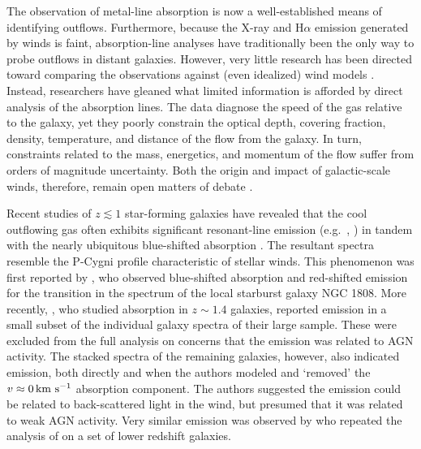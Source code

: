 \documentclass[12pt,preprint]{aastex}
\begin{document}
The observation of metal-line absorption is now a well-established
means of identifying outflows.  Furthermore, because the X-ray and
H$\alpha$ emission generated by winds is faint, absorption-line
analyses have traditionally been the only way to probe outflows in
distant galaxies. However, very little research
has been directed
toward comparing the observations against (even idealized) wind
models \citep[e.g.][]{fmm+09}.  
Instead, researchers have gleaned what limited information
is afforded by direct analysis of the absorption lines.  The data
diagnose the speed of the gas relative to the galaxy, 
yet they poorly constrain the
optical depth, covering fraction, density, temperature, and distance
of the flow from the galaxy.   In turn, constraints related to the
mass, energetics, and momentum of the flow suffer from
orders of magnitude uncertainty.  Both the origin and impact of
galactic-scale winds, therefore, remain open matters of debate
\citep{mqt05,sdr08,sh09,ssr02,od06,kkd+09}.

Recent studies of $z \lesssim 1$ star-forming galaxies have revealed that
the cool outflowing gas often exhibits significant resonant-line emission (e.g.\
, ) in
tandem with the nearly ubiquitous blue-shifted absorption
\citep{wcp+09,rwk+10,cth+10}.  The resultant spectra resemble the P-Cygni
profile characteristic of stellar winds.
This phenomenon was first reported by \citet{phillips93}, who observed 
blue-shifted absorption and red-shifted emission for the \ion{Na}{1}
transition in the spectrum of the local starburst galaxy NGC 1808.
More recently, \cite{wcp+09}, who
studied  absorption in $z \sim 1.4$ galaxies, reported
\ion{Mg}{2} emission in a small subset of the individual galaxy
spectra of their large sample.  These were excluded from the full
analysis on concerns that the emission was related to AGN activity.
The stacked spectra of the remaining galaxies, however, also indicated
\ion{Mg}{2} emission, both directly and when the authors modeled and
`removed' the $v \approx 0\, {\rm km~s^{-1}}$ absorption component.  The
authors suggested the emission could be related to back-scattered
light in the wind, but presumed that it was related to weak
AGN activity.   Very similar  emission was observed by
\cite{rwk+10} who repeated the analysis of \cite{wcp+09} on a set
of lower redshift galaxies. 
\end{document}
